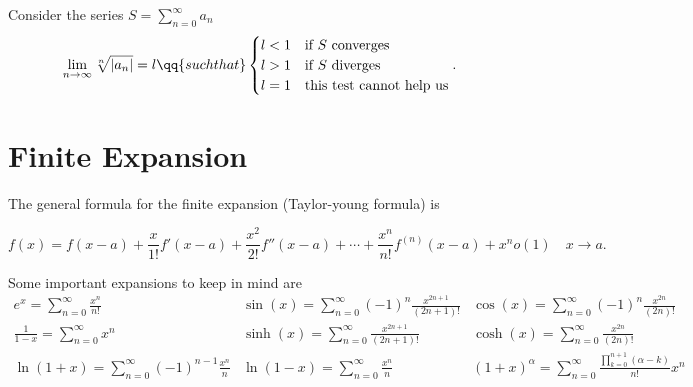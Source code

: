 \begin{theorem}
    Consider the series $S=\sum_{n=0}^{\infty} a_n$
    \[
        \lim_{n \to \infty}\sqrt[n]{|a_n|} = l\qq{such that} \begin{cases}l<1& \text{if $S$ converges}\\
        l>1& \text{if $S$ diverges}\\
l=1& \text{this test cannot help us}\\
\end{cases} 
.\]
        \end{theorem}
\section{Finite Expansion}
The general formula for the finite expansion (Taylor-young formula) is 

\[
    f(x) = f(x-a)+ \frac{x}{1!}f'(x-a)+\frac{x^2}{2!}f''(x-a)+\cdots+\frac{x^n}{n!}f^{(n)}(x-a)+x^no(1) \quad x\to a
.\]
 
Some important expansions to keep in mind are
\[\renewcommand{\arraystretch}{2.5}
\begin{array}{l|l|l}
    e^x=\sum_{n=0}^{\infty} \frac{x^n}{n!}\quad & \sin(x)=\sum_{n=0}^{\infty} (-1)^n \frac{x^{2n+1}}{(2n+1)!}&\cos(x)=\sum_{n=0}^{\infty} (-1)^n \frac{x^{2n}}{(2n)!}\\
            \frac{1}{1-x}=\sum_{n=0}^{\infty} x^n&\sinh(x)=\sum_{n=0}^{\infty} \frac{x^{2n+1}}{(2n+1)!}&\cosh(x)=\sum_{n=0}^{\infty} \frac{x^{2n}}{(2n)!}\\
            \ln(1+x)=\sum_{n=0}^{\infty} (-1)^{n-1}\frac{x^n}{n}&\ln(1-x)=\sum_{n=0}^{\infty} \frac{x^n}{n}&(1+x)^\alpha=\sum_{n=0}^{\infty} \frac{\prod_{k=0}^{n+1}(\alpha-k)  }{n!}x^n
\end{array}
\]
